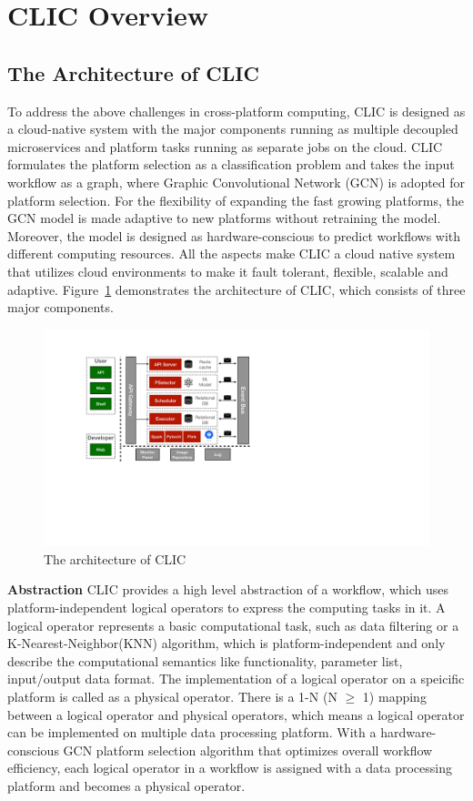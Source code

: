 
\section{CLIC Overview}

\subsection{The Architecture of CLIC}

To address the above challenges in cross-platform computing, CLIC is designed as a cloud-native system with the major components running as multiple decoupled microservices and platform tasks running as separate jobs on the cloud.
CLIC formulates the platform selection as a classification problem and takes the input workflow as a graph, 
where Graphic Convolutional Network (GCN) is adopted for platform selection.
For the flexibility of expanding the fast growing platforms, the GCN model is made adaptive to new platforms without retraining the model.
Moreover, the model is designed as hardware-conscious to predict workflows with different computing resources.
All the aspects make CLIC a cloud native system that utilizes cloud environments to make it fault tolerant, flexible, scalable and adaptive.
Figure~\ref{fig:architecture} demonstrates the architecture of CLIC, which consists of three major components. 



\begin{figure}[tbh]
  \centering
  \includegraphics[width=0.8\linewidth]{figures/CLIC-arch-2.pdf}
  \caption{The architecture of CLIC}
  \label{fig:architecture}
\end{figure}

\textbf{Abstraction} CLIC provides a high level abstraction of a workflow, which uses platform-independent logical operators to express the computing tasks in it. 
A logical operator represents a basic computational task, such as data filtering or a K-Nearest-Neighbor(KNN) algorithm, which is platform-independent and only describe the computational semantics like functionality, parameter list, input/output data format.
The implementation of a logical operator on a speicific platform is called as a physical operator.
There is a 1-N (N $\ge$ 1) mapping between a logical operator and physical operators, which means a logical operator can be implemented on multiple data processing platform.
With a hardware-conscious GCN platform selection algorithm that optimizes overall workflow efficiency, each logical operator in a workflow is assigned with a data processing platform and becomes a physical operator.

